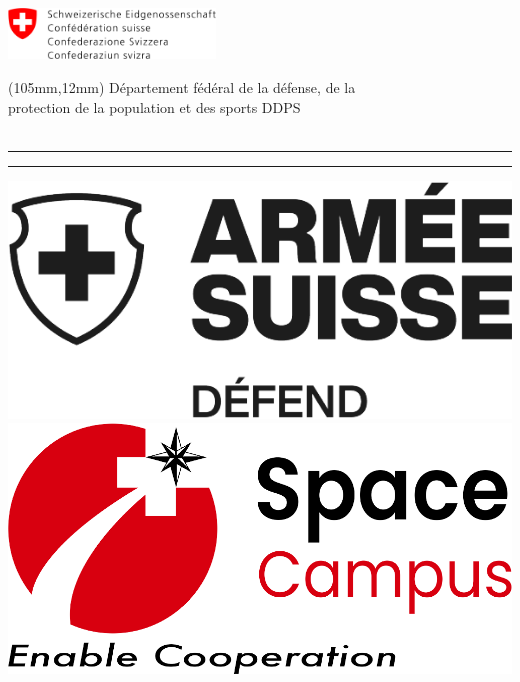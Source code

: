 \thispagestyle{empty}

\begin{adjustwidth}{-11mm}{}
    \includegraphics[width=55mm]{logos/logo_bund.png}
\end{adjustwidth}%

\begin{textblock*}{70mm}(105mm,12mm)
    {\fontsize{7.5}{10}\selectfont
    \noindent Département fédéral de la défense, de la \\
    protection de la population et des sports DDPS\\[0.5\baselineskip]
    \textbf{\relevantdepartment} \\
    \relevantsection}
\end{textblock*}

\vspace{25.6mm}
\fontsize{10}{13}\selectfont
\noindent \textbf{\reportauthor} \reportdate

\vspace{4mm}
  
\noindent \rule{160mm}{0.5pt}

\vspace{8mm}
\fontsize{21}{24}\selectfont
\noindent \textbf{\reporttitle}

\vspace{\baselineskip}

\noindent \reportsubtitle

\vspace{13mm}

\noindent \rule{160mm}{0.5pt}

\vspace{4mm}

{\fontsize{7.5}{10}\selectfont
\noindent \reportnumber}
\fontsize{10}{13}\selectfont
\hfill \textbf{\classification}

\vfill

\begin{center}
\includegraphics[width = 0.4\linewidth]{logos/logo_armeesuisse.png}
\hfill
\includegraphics[width = 0.4\linewidth]{logos/logo_spacecampus.png}
\end{center}

\vspace{10mm}


